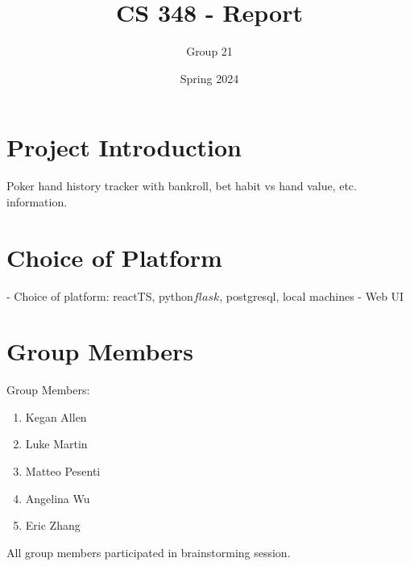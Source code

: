 \documentclass{article}
\title{CS 348 - Report}
\author{Group 21}
\date{Spring 2024}
\begin{document}
\maketitle

\section{Project Introduction}

Poker hand history tracker with bankroll, bet habit vs hand value, etc. information.

\section{Choice of Platform}

- Choice of platform: reactTS, python\(flask\), postgresql, local machines
- Web UI

\section{Group Members}

Group Members:
\begin{enumerate}
    \item Kegan Allen
    \item Luke Martin
    \item Matteo Pesenti
    \item Angelina Wu
    \item Eric Zhang
\end{enumerate}

All group members participated in brainstorming session.
\end{document}
